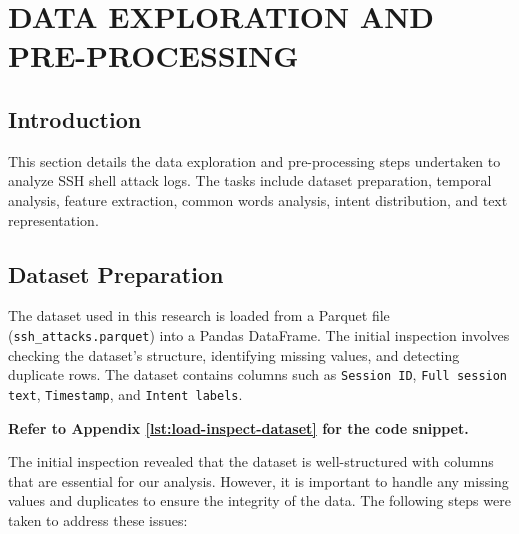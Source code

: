 

\section{DATA EXPLORATION AND PRE-PROCESSING}


    \subsection{Introduction}

        This section details the data exploration and pre-processing steps undertaken to analyze SSH shell attack logs. The tasks include dataset preparation, temporal analysis, feature extraction, common words analysis, intent distribution, and text representation.

    \subsection{Dataset Preparation}
    
        The dataset used in this research is loaded from a Parquet file (\texttt{ssh\_attacks.parquet}) into a Pandas DataFrame. The initial inspection involves checking the dataset's structure, identifying missing values, and detecting duplicate rows. The dataset contains columns such as \texttt{Session ID}, \texttt{Full session text}, \texttt{Timestamp}, and \texttt{Intent labels}.
        
        \textbf{Refer to Appendix \ref{lst:load-inspect-dataset} for the code snippet.}

        The initial inspection revealed that the dataset is well-structured with columns that are essential for our analysis. However, it is important to handle any missing values and duplicates to ensure the integrity of the data. The following steps were taken to address these issues:

